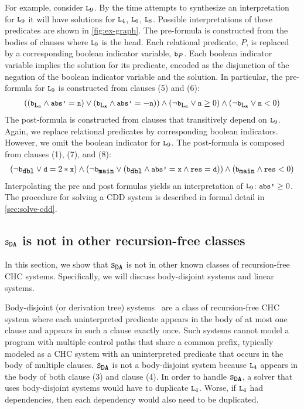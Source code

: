 For example, consider $\cc{L}_9$. By the time \sys attempts to
synthesize an interpretation for $\cc{L}_9$ it will have solutions for
$\cc{L}_4$, $\cc{L}_6$, $\cc{L}_8$.
%
Possible interpretations of these predicates are shown in
\autoref{fig:ex-graph}.
%
The pre-formula is constructed from the bodies of clauses where
$\cc{L}_9$ is the head.
%
Each relational predicate, $P$,
is replaced by a corresponding boolean indicator variable, $\cc{b}_P$.
%
Each boolean indicator variable implies the solution for its
predicate,
encoded as the disjunction of the negation of the boolean
indicator variable and the solution.
%
In particular, the pre-formula for $\cc{L}_9$ is constructed from
clauses (5) and (6):
\begin{gather}
  ((\cc{b}_{\cc{L}_6} \land \cc{abs'} = \cc{n})
  \lor
  (\cc{b}_{\cc{L}_8} \land \cc{abs'} = -\cc{n}))
  \land
  (\neg \cc{b}_{\cc{L}_6} \lor \cc{n} \ge 0)
  \land
  (\neg \cc{b}_{\cc{L}_8} \lor \cc{n} < 0)
\end{gather}
%
The post-formula is constructed from clauses that transitively depend
on $\cc{L}_9$. Again, we replace relational predicates by
corresponding boolean indicators. However, we omit the boolean indicator for
$\cc{L}_9$. The post-formula is composed from clauses (1), (7), and
(8):
\begin{gather}
  (\neg \cc{b}_{\cc{dbl}} \lor \cc{d} = 2*\cc{x})
  \land
  (\neg \cc{b}_{\cc{main}} \lor
    (\cc{b}_{\cc{dbl}}
    \land \cc{abs'}= \cc{x}
    \land \cc{res}=\cc{d} ))
  \land
  (\cc{b}_{\cc{main}} \land \cc{res} < 0)
\end{gather}
%
Interpolating the pre and post formulas yields an interpretation
of $\cc{L}_9$: $\cc{abs'} \geq 0$.
%
The procedure for solving a CDD system is described in formal detail
in \autoref{sec:solve-cdd}.

\subsection{$\mcchc$ is not in other recursion-free classes}
\label{sec:not-in}
%
In this section, we show that $\mcchc$ is not in other
known classes of recursion-free CHC systems. 
%
Specifically, we will
discuss body-disjoint systems and linear systems.
%

Body-disjoint (or derivation tree)
systems~\cite{mcmillan14,bjorner13,heizmann10,rummer13a,rummer13b} are
a class of recursion-free CHC system where each uninterpreted
predicate appears in the body of at most one clause and appears in
such a clause exactly once.
%
Such systems cannot model a program with multiple control paths that
share a common prefix, typically modeled as a CHC system with an
uninterpreted predicate that occurs in the body of multiple clauses.
%
$\mcchc$ is not a body-disjoint system because $\cc{L}_4$ appears in the
body of both clause (3) and clause (4).
%
In order to handle $\mcchc$, a solver that uses
body-disjoint systems would have to duplicate
$\cc{L}_4$. 
%
Worse, if $\cc{L}_4$ had dependencies, then each dependency would also
need to be duplicated.


